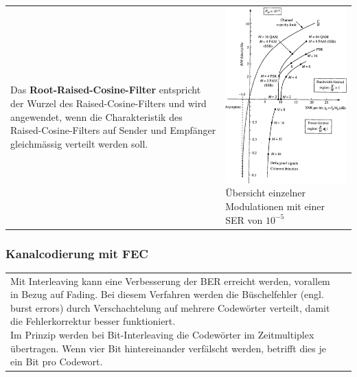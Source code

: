 \begin{tabular}{ll}
{    Das \textbf{Root-Raised-Cosine-Filter} entspricht der Wurzel des
    Raised-Cosine-Filters und wird angewendet, wenn die Charakteristik 
    des Raised-Cosine-Filters auf Sender und Empfänger
    gleichmässig verteilt werden soll.
    } &\parbox{7cm}{
	\includegraphics[width=7cm]{./bilder/modulation_SER.png}\\
	Übersicht einzelner Modulationen mit einer SER von $10^{-5}$
	}
\end{tabular}

\subsubsection{Kanalcodierung mit FEC }
	\begin{tabular}{ll}
		\parbox{11cm}{
			Mit Interleaving kann eine Verbesserung der BER erreicht werden, vorallem in Bezug auf Fading. 
			Bei diesem Verfahren werden die Büschelfehler (engl. burst errors) durch Verschachtelung 
			auf mehrere Codewörter verteilt, damit die Fehlerkorrektur besser funktioniert.\\
			Im Prinzip werden bei Bit-Interleaving die Codewörter im Zeitmultiplex übertragen.
			Wenn vier Bit hintereinander verfälscht werden, betrifft dies je ein Bit pro Codewort.\\
		}	
		& \parbox{7cm}{
		}
	\end{tabular}
	

